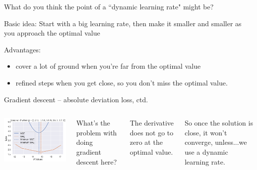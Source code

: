 \documentclass[aspectratio=169]{beamer}
\begin{document}
\begin{frame}{What do you think the point of a ``dynamic learning rate" might be?}

\pause

Basic idea: Start with a big learning rate, then make it smaller and smaller as you approach the optimal value

\pause

\vspace{10mm}

Advantages: 
\begin{itemize}
\item cover a lot of ground when you're far from the optimal value
\item refined steps when you get close, so you don't miss the optimal value.
\end{itemize}

\end{frame}


\begin{frame}{Gradient descent -- absolute deviation loss, ctd.}

\begin{columns}
  \includegraphics[width=\textwidth]{mae_vs_mse}


What's the problem with doing gradient descent here?

\vspace{5mm}

\pause

The derivative does not go to zero at the optimal value.  

\vspace{5mm}

So once the solution is close, it won't converge, unless...\pause we use a dynamic learning rate.
\end{columns}

\end{frame}
\end{document}
